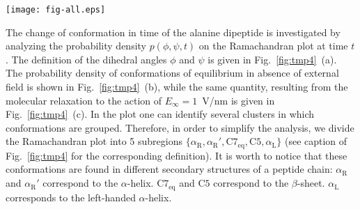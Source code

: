 \documentclass[journal=jctcce,manuscript=manuscript]{achemso}
\newcommand{\confaa}[0]{{\alpha_{\textrm{R}}}}
\newcommand{\confab}[0]{{\alpha_{\textrm{R}}'}}
\newcommand{\confba}[0]{{\textrm{C}7_{\textrm{eq}}}}
\newcommand{\confbb}[0]{{\textrm{C}5}}
\newcommand{\confc}[0]{{\alpha_{\textrm{L}}}}
\begin{document}
\begin{figure*}
  \centering
  \texttt{[image: fig-all.eps]}
  \caption{
    The probability density of the conformations of the alanine dipeptide plotted on the Ramachandran plot.
    (a): Two dihedral angles
    $\phi$ and $\psi$ are used to represent the molecular conformations of the alanine dipeptide.
    (b): The equilibrium probability density 
    at $t=0$~\textsf{ps}. (c): The probability density of equilibrium at $t=1000$~\textsf{ps}, resulting from the application of a constant EF of 1~V/nm. Darker color
    indicates higher probability.
    Plots are divided into 5 subregions corresponding
    to 5 molecular conformations:
    $\confaa = \{(\phi, \psi) | -134^\circ \leq \phi <  13^\circ, -125^\circ \leq \psi < 74^\circ\}$,
    $\confab = \{(\phi, \psi) |  128^\circ \leq \phi < 226^\circ, -125^\circ \leq \psi < 74^\circ\}$,
    $\confba = \{(\phi, \psi) | -110^\circ \leq \phi <  13^\circ,   74^\circ \leq \psi < 235^\circ\}$,
    $\confbb = \{(\phi, \psi) |  128^\circ \leq \phi < 250^\circ,   74^\circ \leq \psi < 235^\circ\}$,
    $\confc   = \{(\phi, \psi) |   13^\circ \leq \phi < 128^\circ, -180^\circ \leq \psi < 180^\circ\}$.
    Considering the angular periodicity, the angle, for example, $226^\circ$ corresponds to $-134^\circ$
    on the plot (b) and (c).
    This division is the same for both plot (b) and (c).
  }
  \label{fig:tmp4}
\end{figure*}

The change of conformation in time of the alanine dipeptide is
investigated by analyzing the probability density $p(\phi,\psi,t)$ on
the Ramachandran plot at time $t$. The definition of the dihedral
angles $\phi$ and $\psi$ is given in Fig.~\ref{fig:tmp4}~(a).
The probability density of conformations of equilibrium in absence of external field is shown in Fig.~\ref{fig:tmp4}~(b), while the same quantity, resulting from the molecular relaxation to the action of $E_{\infty} = 1$~V/nm is
given in Fig.~\ref{fig:tmp4}~(c). In the plot one can identify several clusters
in which conformations are grouped.
Therefore, in order to simplify the analysis, we divide the
Ramachandran plot into 5 subregions $\{\confaa, \confab, \confba, \confbb, \confc\}$
(see caption of Fig.~\ref{fig:tmp4} for the corresponding definition).
It is worth to notice that these conformations
are found in different secondary structures of a peptide chain:
$\confaa$ and $\confab$ 
correspond to the $\alpha$-helix. $\confba$ and $\confbb$ 
correspond to the $\beta$-sheet. $\confc$ corresponds to the
left-handed $\alpha$-helix.
\end{document}
